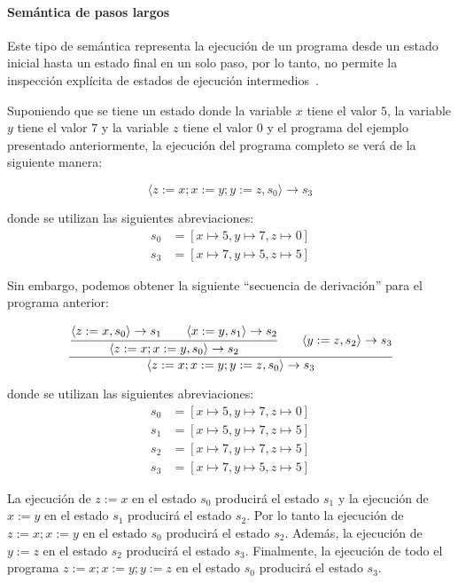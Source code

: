\paragraph{Semántica de pasos largos}

Este tipo de semántica representa la ejecución de un programa desde un estado inicial hasta un estado final en un solo paso, por lo tanto, no permite la inspección explícita de estados de ejecución intermedios~\citep{nipkow}.

Suponiendo que se tiene un estado donde la variable $x$ tiene el valor $5$, la variable $y$ tiene el valor $7$ y la variable $z$ tiene el valor $0$ y el programa del ejemplo presentado anteriormente, la ejecución del programa completo se verá de la siguiente manera:

\begin{equation*}
\langle z:=x; x:=y; y:=z, s_{0} \rangle \rightarrow s_{3}
\end{equation*}

donde se utilizan las siguientes abreviaciones:
\begin{align*}
s_{0} &= [x\mapsto5, y\mapsto7, z\mapsto0]\\
s_{3} &= [x\mapsto7, y\mapsto5, z\mapsto5]
\end{align*}

Sin embargo, podemos obtener la siguiente ``secuencia de derivación'' para el programa anterior:

\begin{equation*}
\cfrac{
  \cfrac{\langle z:=x, s_{0}\rangle \rightarrow s_{1} \qquad \langle x:=y, s_{1} \rangle \rightarrow s_{2}}
    {\langle z:=x; x:=y, s_{0} \rangle \rightarrow s_{2}}
  \qquad
  \langle y:=z, s_{2} \rangle \rightarrow s_{3}
  }
  {\langle z:=x; x:=y; y:=z, s_{0} \rangle \rightarrow s_{3}}
\end{equation*}

donde se utilizan las siguientes abreviaciones:
\begin{align*}
s_{0} &= [x\mapsto5, y\mapsto7, z\mapsto0]\\
s_{1} &= [x\mapsto5, y\mapsto7, z\mapsto5]\\
s_{2} &= [x\mapsto7, y\mapsto7, z\mapsto5]\\
s_{3} &= [x\mapsto7, y\mapsto5, z\mapsto5]
\end{align*}

La ejecución de $z:=x$ en el estado $s_{0}$ producirá el estado $s_{1}$ y la ejecución de $x:=y$ en el estado $s_{1}$ producirá el estado $s_{2}$.
Por lo tanto la ejecución de $z:=x; x:=y$ en el estado $s_{0}$ producirá el estado $s_{2}$.
Además, la ejecución de $y:=z$ en el estado $s_{2}$ producirá el estado $s_{3}$.
Finalmente, la ejecución de todo el programa $z:=x; x:=y; y:=z$ en el estado $s_{0}$ producirá el estado $s_{3}$.

